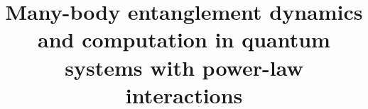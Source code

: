 
\title{Many-body entanglement dynamics and computation in quantum systems with power-law interactions}

% 



\frontmatter
\pagestyle{empty}
\singlespacing


\pagestyle{plain}
\setcounter{page}{2}


\tableofcontents %


\newpage
{}
\mainmatter



% 






% 

\appendix







\singlespacing
\backmatter


\printbibliography[heading=bibintoc]%



